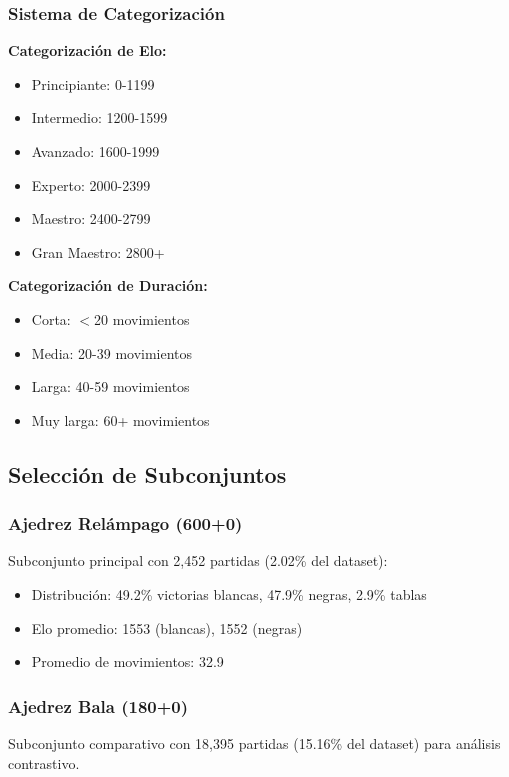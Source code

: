 \documentclass[11pt,a4paper]{article}
\begin{document}
\subsubsection{Sistema de Categorizaci\'on}

\textbf{Categorizaci\'on de Elo:}
\begin{itemize}
\item Principiante: 0-1199
\item Intermedio: 1200-1599
\item Avanzado: 1600-1999
\item Experto: 2000-2399
\item Maestro: 2400-2799
\item Gran Maestro: 2800+
\end{itemize}

\textbf{Categorizaci\'on de Duraci\'on:}
\begin{itemize}
\item Corta: $<$20 movimientos
\item Media: 20-39 movimientos
\item Larga: 40-59 movimientos
\item Muy larga: 60+ movimientos
\end{itemize}

\subsection{Selecci\'on de Subconjuntos}

\subsubsection{Ajedrez Rel\'ampago (600+0)}

Subconjunto principal con 2,452 partidas (2.02\% del dataset):
\begin{itemize}
\item Distribuci\'on: 49.2\% victorias blancas, 47.9\% negras, 2.9\% tablas
\item Elo promedio: 1553 (blancas), 1552 (negras)
\item Promedio de movimientos: 32.9
\end{itemize}

\subsubsection{Ajedrez Bala (180+0)}

Subconjunto comparativo con 18,395 partidas (15.16\% del dataset) para an\'alisis contrastivo.
\end{document}
